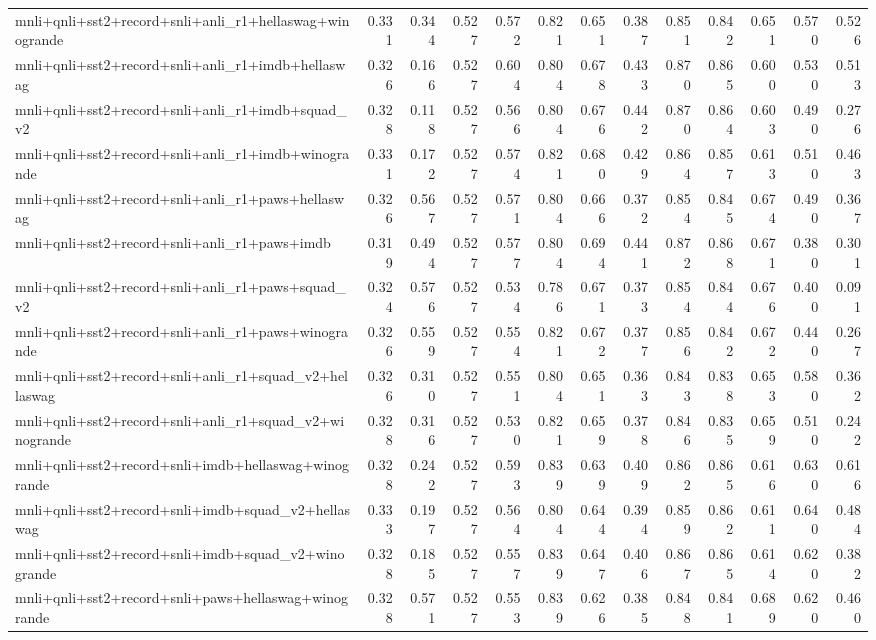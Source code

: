 \begin{table}[t]
\begin{tabular}{lrrrrrrrrrrrr}
    mnli+qnli+sst2+record+snli+anli\_r1+hellaswag+winogrande & 0.331 & 0.344 & 0.527 & 0.572 & 0.821 & 0.651 & 0.387 & 0.851 & 0.842 & 0.651 & 0.570 & 0.526 \\
    mnli+qnli+sst2+record+snli+anli\_r1+imdb+hellaswag & 0.326 & 0.166 & 0.527 & 0.604 & 0.804 & 0.678 & 0.433 & 0.870 & 0.865 & 0.600 & 0.530 & 0.513 \\
    mnli+qnli+sst2+record+snli+anli\_r1+imdb+squad\_v2 & 0.328 & 0.118 & 0.527 & 0.566 & 0.804 & 0.676 & 0.442 & 0.870 & 0.864 & 0.603 & 0.490 & 0.276 \\
    mnli+qnli+sst2+record+snli+anli\_r1+imdb+winogrande & 0.331 & 0.172 & 0.527 & 0.574 & 0.821 & 0.680 & 0.429 & 0.864 & 0.857 & 0.613 & 0.510 & 0.463 \\
    mnli+qnli+sst2+record+snli+anli\_r1+paws+hellaswag & 0.326 & 0.567 & 0.527 & 0.571 & 0.804 & 0.666 & 0.372 & 0.854 & 0.845 & 0.674 & 0.490 & 0.367 \\
    mnli+qnli+sst2+record+snli+anli\_r1+paws+imdb & 0.319 & 0.494 & 0.527 & 0.577 & 0.804 & 0.694 & 0.441 & 0.872 & 0.868 & 0.671 & 0.380 & 0.301 \\
    mnli+qnli+sst2+record+snli+anli\_r1+paws+squad\_v2 & 0.324 & 0.576 & 0.527 & 0.534 & 0.786 & 0.671 & 0.373 & 0.854 & 0.844 & 0.676 & 0.400 & 0.091 \\
    mnli+qnli+sst2+record+snli+anli\_r1+paws+winogrande & 0.326 & 0.559 & 0.527 & 0.554 & 0.821 & 0.672 & 0.377 & 0.856 & 0.842 & 0.672 & 0.440 & 0.267 \\
    mnli+qnli+sst2+record+snli+anli\_r1+squad\_v2+hellaswag & 0.326 & 0.310 & 0.527 & 0.551 & 0.804 & 0.651 & 0.363 & 0.843 & 0.838 & 0.653 & 0.580 & 0.362 \\
    mnli+qnli+sst2+record+snli+anli\_r1+squad\_v2+winogrande & 0.328 & 0.316 & 0.527 & 0.530 & 0.821 & 0.659 & 0.378 & 0.846 & 0.835 & 0.659 & 0.510 & 0.242 \\
    mnli+qnli+sst2+record+snli+imdb+hellaswag+winogrande & 0.328 & 0.242 & 0.527 & 0.593 & 0.839 & 0.639 & 0.409 & 0.862 & 0.865 & 0.616 & 0.630 & 0.616 \\
    mnli+qnli+sst2+record+snli+imdb+squad\_v2+hellaswag & 0.333 & 0.197 & 0.527 & 0.564 & 0.804 & 0.644 & 0.394 & 0.859 & 0.862 & 0.611 & 0.640 & 0.484 \\
    mnli+qnli+sst2+record+snli+imdb+squad\_v2+winogrande & 0.328 & 0.185 & 0.527 & 0.557 & 0.839 & 0.647 & 0.406 & 0.867 & 0.865 & 0.614 & 0.620 & 0.382 \\
    mnli+qnli+sst2+record+snli+paws+hellaswag+winogrande & 0.328 & 0.571 & 0.527 & 0.553 & 0.839 & 0.626 & 0.385 & 0.848 & 0.841 & 0.689 & 0.620 & 0.460 \\

\end{tabular}
\end{table}
